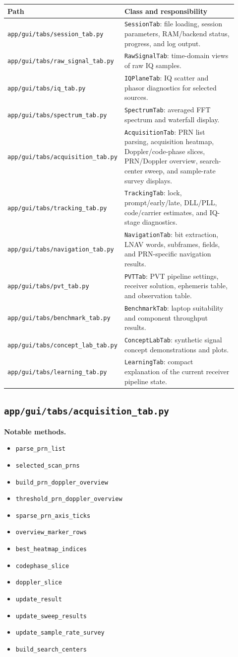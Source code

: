\documentclass[11pt,a4paper]{article}
\newcommand{\codepath}[1]{\nolinkurl{#1}}
\newcommand{\codeheading}[1]{\texorpdfstring{\codepath{#1}}{#1}}
\newcommand{\codesym}[1]{\nolinkurl{#1}}
\newcommand{\apisym}[1]{\item \codesym{#1}}
\begin{document}
\begin{longtable}{P{0.34\linewidth}L{0.58\linewidth}}
\textbf{Path} & \textbf{Class and responsibility}\\
\hline
\codepath{app/gui/tabs/session_tab.py} & \texttt{SessionTab}: file loading, session parameters, RAM/backend status, progress, and log output.\\
\codepath{app/gui/tabs/raw_signal_tab.py} & \texttt{RawSignalTab}: time-domain views of raw IQ samples.\\
\codepath{app/gui/tabs/iq_tab.py} & \texttt{IQPlaneTab}: IQ scatter and phasor diagnostics for selected sources.\\
\codepath{app/gui/tabs/spectrum_tab.py} & \texttt{SpectrumTab}: averaged FFT spectrum and waterfall display.\\
\codepath{app/gui/tabs/acquisition_tab.py} & \texttt{AcquisitionTab}: PRN list parsing, acquisition heatmap, Doppler/code-phase slices, PRN/Doppler overview, search-center sweep, and sample-rate survey displays.\\
\codepath{app/gui/tabs/tracking_tab.py} & \texttt{TrackingTab}: lock, prompt/early/late, DLL/PLL, code/carrier estimates, and IQ-stage diagnostics.\\
\codepath{app/gui/tabs/navigation_tab.py} & \texttt{NavigationTab}: bit extraction, LNAV words, subframes, fields, and PRN-specific navigation results.\\
\codepath{app/gui/tabs/pvt_tab.py} & \texttt{PVTTab}: PVT pipeline settings, receiver solution, ephemeris table, and observation table.\\
\codepath{app/gui/tabs/benchmark_tab.py} & \texttt{BenchmarkTab}: laptop suitability and component throughput results.\\
\codepath{app/gui/tabs/concept_lab_tab.py} & \texttt{ConceptLabTab}: synthetic signal concept demonstrations and plots.\\
\codepath{app/gui/tabs/learning_tab.py} & \texttt{LearningTab}: compact explanation of the current receiver pipeline state.\\
\end{longtable}

\subsection{\codeheading{app/gui/tabs/acquisition_tab.py}}

\textbf{Notable methods.}
\begin{itemize}
  \apisym{parse_prn_list}
  \apisym{selected_scan_prns}
  \apisym{build_prn_doppler_overview}
  \apisym{threshold_prn_doppler_overview}
  \apisym{sparse_prn_axis_ticks}
  \apisym{overview_marker_rows}
  \apisym{best_heatmap_indices}
  \apisym{codephase_slice}
  \apisym{doppler_slice}
  \apisym{update_result}
  \apisym{update_sweep_results}
  \apisym{update_sample_rate_survey}
  \apisym{build_search_centers}
\end{itemize}
\end{document}
